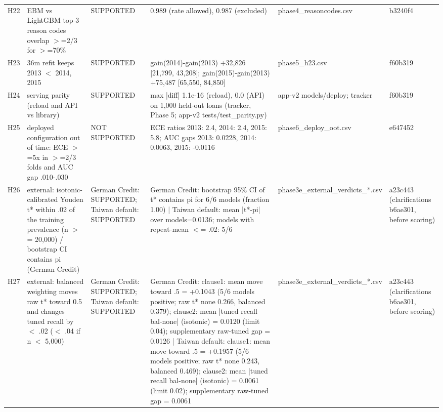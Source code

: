 \begin{table}[t]
\begin{tabular}{lp{5.2cm}p{5.2cm}p{5.2cm}lp{5.2cm}}
H22 & EBM vs LightGBM top-3 reason codes overlap $>$=2/3 for $>$=70\% & SUPPORTED & 0.989 (rate allowed), 0.987 (excluded) & phase4\_reasoncodes.csv & b3240f4 \\
H23 & 36m refit keeps 2013 $<$ 2014, 2015 & SUPPORTED & gain(2014)-gain(2013) +32,826 [21,799, 43,208]; gain(2015)-gain(2013) +75,487 [65,550, 84,850] & phase5\_h23.csv & f60b319 \\
H24 & serving parity (reload and API vs library) & SUPPORTED & max |diff| 1.1e-16 (reload), 0.0 (API) on 1,000 held-out loans (tracker, Phase 5; app-v2 tests/test\_parity.py) & app-v2 models/deploy; tracker & f60b319 \\
H25 & deployed configuration out of time: ECE $>$=5x in $>$=2/3 folds and AUC gap .010-.030 & NOT SUPPORTED & ECE ratios 2013: 2.4, 2014: 2.4, 2015: 5.8; AUC gaps 2013: 0.0228, 2014: 0.0063, 2015: -0.0116 & phase6\_deploy\_oot.csv & e647452 \\
H26 & external: isotonic-calibrated Youden t* within .02 of the training prevalence (n $>$= 20,000) / bootstrap CI contains pi (German Credit) & German Credit: SUPPORTED; Taiwan default: SUPPORTED & German Credit: bootstrap 95\% CI of t* contains pi for 6/6 models (fraction 1.00) | Taiwan default: mean |t*-pi| over models=0.0136; models with repeat-mean $<$= .02: 5/6 & phase3e\_external\_verdicts\_*.csv & a23c443 (clarifications b6ae301, before scoring) \\
H27 & external: balanced weighting moves raw t* toward 0.5 and changes tuned recall by $<$ .02 ($<$ .04 if n $<$ 5,000) & German Credit: SUPPORTED; Taiwan default: SUPPORTED & German Credit: clause1: mean move toward .5 = +0.1043 (5/6 models positive; raw t* none 0.266, balanced 0.379); clause2: mean |tuned recall bal-none| (isotonic) = 0.0120 (limit 0.04); supplementary raw-tuned gap = 0.0126 | Taiwan default: clause1: mean move toward .5 = +0.1957 (5/6 models positive; raw t* none 0.243, balanced 0.469); clause2: mean |tuned recall bal-none| (isotonic) = 0.0061 (limit 0.02); supplementary raw-tuned gap = 0.0061 & phase3e\_external\_verdicts\_*.csv & a23c443 (clarifications b6ae301, before scoring) \\

\end{tabular}
\end{table}
